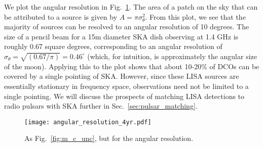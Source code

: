 We plot the angular resolution in Fig.~\ref{fig:ang_res}. The area of a patch on the sky that can be attributed to a source is given by $A = \pi \sigma_\theta^2$. From this plot, we see that the majority of sources can be resolved to an angular resolution of 10 degrees. The size of a pencil beam for a 15m diameter SKA dish observing at 1.4 GHz is roughly 0.67 square degrees, corresponding to an angular resolution of $\sigma_\theta = \sqrt{(0.67 / \pi)} = 0.46^\circ$ (which, for intuition, is approximately the angular size of the moon). Applying this to the plot shows that about 10-20\% of DCOs can be covered by a single pointing of SKA. However, since these LISA sources are essentially stationary in frequency space, observations need not be limited to a single pointing. We will discuss the prospects of matching LISA detections to radio pulsars with SKA further in Sec.~\ref{sec:pulsar_matching}.

\begin{figure}[ht]
    \centering
    \texttt{[image: angular\_resolution\_4yr.pdf]}
    \caption{As Fig.~\ref{fig:m_c_unc}, but for the angular resolution.}
    \label{fig:ang_res}
\end{figure}
